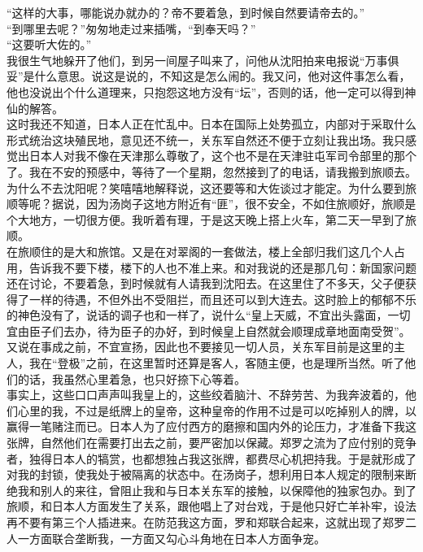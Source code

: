 “这样的大事，哪能说办就办的？帝不要着急，到时候自然要请帝去的。”\\

“到哪里去呢？”匆匆地走过来插嘴，“到奉天吗？”\\

“这要听大佐的。”\\

我很生气地躲开了他们，到另一间屋子叫来了，问他从沈阳拍来电报说“万事俱妥”是什么意思。说这是说的，不知这是怎么闹的。我又问，他对这件事怎么看，他也没说出个什么道理来，只抱怨这地方没有“坛”，否则的话，他一定可以得到神仙的解答。\\

这时我还不知道，日本人正在忙乱中。日本在国际上处势孤立，内部对于采取什么形式统治这块殖民地，意见还不统一，关东军自然还不便于立刻让我出场。我只感觉出日本人对我不像在天津那么尊敬了，这个也不是在天津驻屯军司令部里的那个了。我在不安的预感中，等待了一个星期，忽然接到了的电话，请我搬到旅顺去。\\

为什么不去沈阳呢？笑嘻嘻地解释说，这还要等和大佐谈过才能定。为什么要到旅顺等呢？据说，因为汤岗子这地方附近有“匪”，很不安全，不如住旅顺好，旅顺是个大地方，一切很方便。我听着有理，于是这天晚上搭上火车，第二天一早到了旅顺。\\

在旅顺住的是大和旅馆。又是在对翠阁的一套做法，楼上全部归我们这几个人占用，告诉我不要下楼，楼下的人也不准上来。和对我说的还是那几句：新国家问题还在讨论，不要着急，到时候就有人请我到沈阳去。在这里住了不多天，父子便获得了一样的待遇，不但外出不受阻拦，而且还可以到大连去。这时脸上的郁郁不乐的神色没有了，说话的调子也和一样了，说什么“皇上天威，不宜出头露面，一切宜由臣子们去办，待为臣子的办好，到时候皇上自然就会顺理成章地面南受贺”。又说在事成之前，不宜宣扬，因此也不要接见一切人员，关东军目前是这里的主人，我在“登极”之前，在这里暂时还算是客人，客随主便，也是理所当然。听了他们的话，我虽然心里着急，也只好捺下心等着。\\

事实上，这些口口声声叫我皇上的，这些绞着脑汁、不辞劳苦、为我奔波着的，他们心里的我，不过是纸牌上的皇帝，这种皇帝的作用不过是可以吃掉别人的牌，以赢得一笔赌注而已。日本人为了应付西方的磨擦和国内外的论压力，才准备下我这张牌，自然他们在需要打出去之前，要严密加以保藏。郑罗之流为了应付别的竞争者，独得日本人的犒赏，也都想独占我这张牌，都费尽心机把持我。于是就形成了对我的封锁，使我处于被隔离的状态中。在汤岗子，想利用日本人规定的限制来断绝我和别人的来往，曾阻止我和与日本关东军的接触，以保障他的独家包办。到了旅顺，和日本人方面发生了关系，跟他唱上了对台戏，于是他只好亡羊补牢，设法再不要有第三个人插进来。在防范我这方面，罗和郑联合起来，这就出现了郑罗二人一方面联合垄断我，一方面又勾心斗角地在日本人方面争宠。\\

